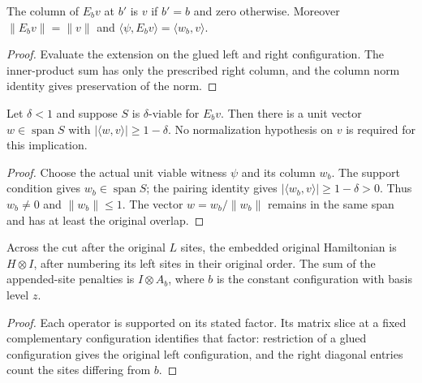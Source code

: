 \begin{lemma}
    \label{thm:lvv_right_basis_extension}
    \leanok
    The column of $E_bv$ at $b'$ is $v$ if $b'=b$ and zero otherwise.
    Moreover $\|E_bv\|=\|v\|$ and
    $\langle\psi,E_bv\rangle=\langle w_b,v\rangle$.
\end{lemma}
\begin{proof}
    \leanok
    Evaluate the extension on the glued left and right configuration.
    The inner-product sum has only the prescribed right column, and the
    column norm identity gives preservation of the norm.
\end{proof}

\begin{lemma}
    \label{thm:lvv_retained_prefix_extraction}
    \leanok
    Let $\delta<1$ and suppose $S$ is $\delta$-viable for $E_bv$.
    Then there is a unit vector $w\in\operatorname{span}S$ with
    $|\langle w,v\rangle|\ge1-\delta$.
    No normalization hypothesis on $v$ is required for this implication.
\end{lemma}
\begin{proof}
    \leanok
    Choose the actual unit viable witness $\psi$ and its column $w_b$.
    The support condition gives $w_b\in\operatorname{span}S$; the pairing
    identity gives $|\langle w_b,v\rangle|\ge1-\delta>0$.
    Thus $w_b\ne0$ and $\|w_b\|\le1$.
    The vector $w=w_b/\|w_b\|$ remains in the same span and has at least
    the original overlap.
\end{proof}

\begin{lemma}
    \label{thm:lvv_padding_tensor_coordinates}
    \leanok
    Across the cut after the original $L$ sites, the embedded original
    Hamiltonian is $H\otimes I$, after numbering its left sites in their
    original order. The sum of the appended-site penalties is $I\otimes A_b$,
    where $b$ is the constant configuration with basis level $z$.
\end{lemma}
\begin{proof}
    \leanok
    Each operator is supported on its stated factor. Its matrix slice at
    a fixed complementary configuration identifies that factor: restriction
    of a glued configuration gives the original left configuration, and
    the right diagonal entries count the sites differing from $b$.
\end{proof}

